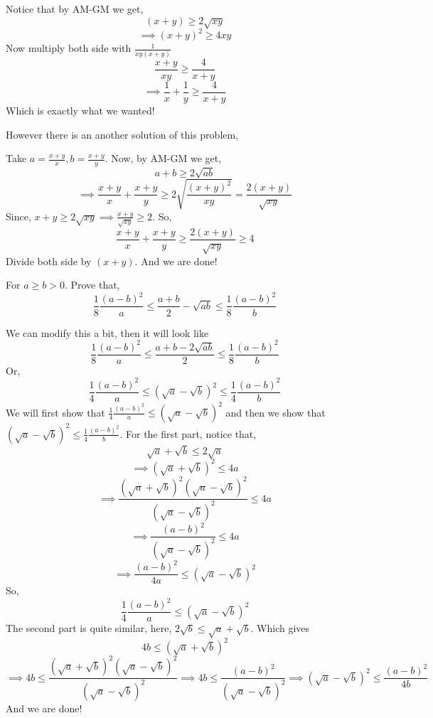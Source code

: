 \begin{soln}
Notice that by AM-GM we get, 
\[(x+y) \ge 2 \sqrt{xy}\]
\[\implies (x+y)^2 \ge 4xy\]
Now multiply both side with $\frac{1}{xy(x+y)} $
\[\frac{x+y}{xy} \ge \frac{4}{x+y}\]
\[\implies \frac{1}{x} + \frac{1}{y} \ge \frac{4}{x+y}\]
Which is exactly what we wanted!

\end{soln}
However there is an another solution of this problem,
\begin{soln}
Take $a=\frac{x+y}{x}, b = \frac {x+y}{y}$. 
Now, by AM-GM we get, 
\[ a+b\ge 2\sqrt{ab}\]
\[\implies \frac{x+y}{x} + \frac{x+y}{y}\ge 2\sqrt{\frac{(x+y)^2}{xy}}=\frac{2(x+y)}{\sqrt{xy}} \]
Since, $x+y\ge 2\sqrt {xy}\implies \frac {x+y}{\sqrt{xy}}\ge 2  $. So, 
\[\frac{x+y}{x} + \frac{x+y}{y}\ge \frac{2(x+y)}{\sqrt{xy}}\ge 4\]
Divide both side by $(x+y)$. And we are done!

\end{soln}



\begin{example}
For $a\ge b> 0$. Prove that,
\[ \frac{1}{8}\frac{(a-b)^2}{a} \le \frac{a+b}{2} -\sqrt{ab} \le\frac{1}{8}\frac{(a-b)^2}{b}\]
\end{example}
 
 \begin{soln}
 We can modify this a bit, then it will look like 
 \[\frac{1}{8}\frac{(a-b)^2}{a} \le \frac{a+b-2\sqrt{ab}}{2} \le\frac{1}{8}\frac{(a-b)^2}{b}\]
 Or, \[\frac{1}{4}\frac{(a-b)^2}{a} \le (\sqrt{a}-\sqrt {b})^2 \le\frac{1}{4}\frac{(a-b)^2}{b}\]
We will first show that $\frac{1}{4}\frac{(a-b)^2}{a} \le  (\sqrt{a}-\sqrt {b})^2 $ and then we show that $  (\sqrt{a}-\sqrt {b})^2 \le \frac{1}{4}\frac{(a-b)^2}{b}$.
For the first part, notice that,
\[\sqrt{a} + \sqrt {b} \le 2\sqrt {a}\]
\[\implies (\sqrt{a} + \sqrt {b})^2 \le 4a\]
\[\implies \frac{(\sqrt{a}+\sqrt{b})^2(\sqrt {a}- \sqrt {b})^2}{(\sqrt {a}- \sqrt {b})^2}\le 4a\]
\[\implies \frac{(a-b)^2}{(\sqrt{a}- \sqrt {b})^2}\le 4a \]
    \[\implies \frac{(a-b)^2}{4a}\le (\sqrt{a}- \sqrt {b})^2\]
    So, \[\frac{1}{4}\frac{(a-b)^2}{a} \le  (\sqrt{a}-\sqrt {b})^2\]
    The second part is quite similar, 
    here, 
    $2\sqrt{b}\le \sqrt{a}+ \sqrt{b}$. Which gives 
    \[4b\le(\sqrt{a}+ \sqrt{b})^2 \]
\[\implies 4b\le \frac{(\sqrt{a}+\sqrt{b})^2(\sqrt {a}- \sqrt {b})^2}{(\sqrt {a}- \sqrt {b})^2} \implies 4b\le \frac{(a-b)^2}{(\sqrt{a}- \sqrt {b})^2} \implies (\sqrt{a}- \sqrt {b})^2\le \frac{(a-b)^2}{4b}
    \] 
And we are done!
    
    
 \end{soln}
 
